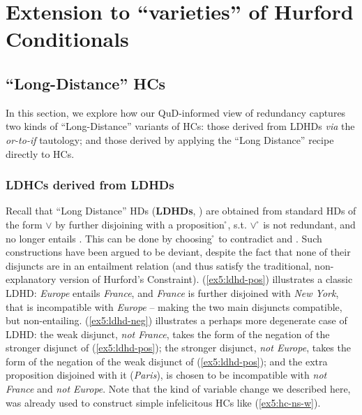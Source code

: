 \section{Extension to ``varieties'' of Hurford Conditionals}


\subsection{``Long-Distance'' HCs}
In this section, we explore how our QuD-informed view of redundancy captures two kinds of ``Long-Distance'' variants of HCs: those derived from LDHDs \textit{via} the \textit{or-to-if} tautology; and those derived by applying the ``Long Distance'' recipe directly to HCs. 


\subsubsection{LDHCs derived from LDHDs}

Recall that ``Long Distance'' HDs (\textbf{LDHDs}, ) are obtained from standard HDs of the form \p{} $\vee$ \pplus{} by further disjoining \pplus{} with a proposition \r{}, s.t. \pplus{} $\vee$ \r{} is not redundant, and no longer entails \p. This can be done by choosing \r{} to contradict \pplus{} and \p{}. Such constructions have been argued to be deviant, despite the fact that none of their disjuncts are in an entailment relation (and thus satisfy the traditional, non-explanatory version of Hurford's Constraint). (\ref{ex5:ldhd-pos}) illustrates a classic LDHD: \textit{Europe} entails \textit{France}, and \textit{France} is further disjoined with \textit{New York}, that is incompatible with \textit{Europe} -- making the two main disjuncts compatible, but non-entailing.  (\ref{ex5:ldhd-neg}) illustrates a perhaps more degenerate case of LDHD: the weak disjunct, \textit{not France}, takes the form of the negation of the stronger disjunct of (\ref{ex5:ldhd-pos}); the stronger disjunct, \textit{not Europe}, takes the form of the negation of the weak disjunct of (\ref{ex5:ldhd-pos}); and the extra proposition disjoined with it (\textit{Paris}), is chosen to be incompatible with \textit{not France} and \textit{not Europe}. Note that the kind of variable change we described here, was already used to construct simple infelicitous HCs like (\ref{ex5:hc-ns-w}).

\begin{exe}
	\begin{xlist}
		\label{ex5:ldhd-pos}
		\label{ex5:ldhd-neg}
	\end{xlist}
\end{exe}

